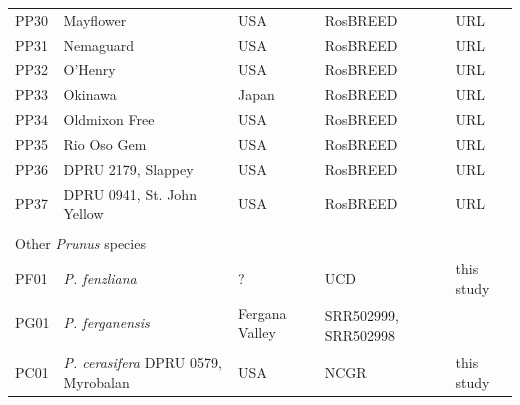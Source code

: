 \documentclass[12pt]{article}
\begin{document}
\begin{center}
\begin{longtable}{lllll}
                 PP30 &Mayflower&USA &RosBREED &URL \\
                 PP31 &Nemaguard &USA &RosBREED &URL \\
                 PP32 &O'Henry &USA &RosBREED &URL \\
                 PP33 &Okinawa &Japan &RosBREED &URL \\
                 PP34 &Oldmixon Free &USA &RosBREED &URL \\
                 PP35 &Rio Oso Gem &USA &RosBREED &URL \\
                 PP36 &DPRU 2179, Slappey &USA &RosBREED &URL \\
                 PP37 &DPRU 0941, St. John Yellow &USA &RosBREED &URL \\
		\\
                 \multicolumn{5}{l}{Other \emph{Prunus} species}  \\
                 PF01 &\emph{P. fenzliana} &? &UCD &this study\\
                 PG01 &\emph{P. ferganensis} &Fergana Valley &
		\multirow{2}{1cm}{SRR502999, SRR502998} &\citealt{verde2013high}\\
                 \\
                 PC01 &\emph{P. cerasifera} DPRU 0579, Myrobalan &USA &NCGR &this study\\ \hline

\end{longtable}
\end{center}
\end{document}
